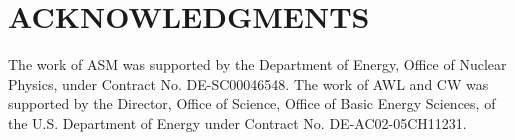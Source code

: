 \documentclass{ar-1col}
\begin{document}
\section*{ACKNOWLEDGMENTS}
The work of ASM was supported by the Department of Energy, Office of Nuclear Physics, under Contract No. DE-SC00046548.
The work of AWL and CW was supported by the Director, Office of Science, Office of Basic Energy Sciences, of the U.S. Department of Energy under Contract No. DE-AC02-05CH11231.





\end{document}
